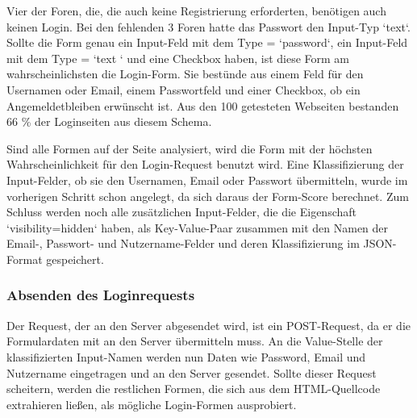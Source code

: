 Vier der Foren, die, die auch keine Registrierung erforderten, benötigen auch keinen Login. Bei den fehlenden 3 Foren hatte das Passwort den Input-Typ `text`.
Sollte die Form genau ein Input-Feld mit dem Type = `password`, ein Input-Feld mit dem Type = `text ` und eine Checkbox haben, ist diese Form am wahrscheinlichsten die Login-Form. Sie bestünde aus einem Feld für den Usernamen oder Email, einem Passwortfeld und einer Checkbox, ob ein Angemeldetbleiben erwünscht ist. Aus den 100 getesteten Webseiten bestanden 66 \% der Loginseiten aus diesem Schema.

Sind alle Formen auf der Seite analysiert, wird die Form mit der höchsten Wahrscheinlichkeit für den Login-Request benutzt wird. Eine Klassifizierung der Input-Felder, ob sie den Usernamen, Email oder Passwort übermitteln, wurde im vorherigen Schritt schon angelegt, da sich daraus der Form-Score berechnet. Zum Schluss werden noch alle zusätzlichen Input-Felder, die die Eigenschaft `visibility=hidden` haben, als Key-Value-Paar zusammen mit den Namen der Email-, Passwort- und Nutzername-Felder und deren Klassifizierung im JSON-Format gespeichert.

\subsubsection{Absenden des Loginrequests}
Der Request, der an den Server abgesendet wird, ist ein POST-Request, da er die Formulardaten mit an den Server übermitteln muss.
An die Value-Stelle der klassifizierten Input-Namen werden nun Daten wie Password, Email und Nutzername eingetragen und an den Server gesendet.
Sollte dieser Request scheitern, werden die restlichen Formen, die sich aus dem HTML-Quellcode extrahieren ließen, als mögliche Login-Formen ausprobiert.


